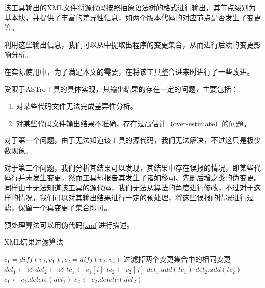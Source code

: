 该工具输出的XML文件将源代码按照抽象语法树的格式进行输出，其节点级别为基本块，并提供了丰富的差异性信息，如两个版本代码的对应节点是否发生了变更等。

利用这些输出信息，我们可以从中提取出程序的变更集合，从而进行后续的变更影响分析。

在实际使用中，为了满足本文的需要，在将该工具整合进来时进行了一些改进。


受限于ASTro工具的具体实现，其输出结果的存在一定的问题，主要包括：
\begin{enumerate}
	\item 对某些代码文件无法完成差异性分析。
	\item 对某些代码文件输出结果不准确，存在过高估计（over-estimate）的问题。
\end{enumerate}

对于第一个问题，由于无法知道该工具的源代码，我们无法解决，不过这只是极少数现象。

对于第二个问题，我们分析其结果可以发现，其结果中存在误报的情况，即某些代码行并未发生变更，然而工具却报告其发生了诸如移动、先删后增之类的伪变更。同样由于无法知道该工具的源代码，我们无法从算法的角度进行修改，不过对于这样的情况，我们可以对其输出结果进行一定的预处理，将这些误报的情况进行过滤，保留一个真变更子集合即可。

预处理算法可以用伪代码\ref {xml}进行描述。

\begin{algorithm}
	\caption{XML结果过滤算法}
	\label{xml}
	\begin{algorithmic}[1]
		\Require $c_1 = diff(v_2, v_1), c_2 = diff(v_2,v_4)$
		\Ensure 过滤掉两个变更集合中的相同变更
		\State $del_1 \gets \varnothing$
		\State $del_2 \gets \varnothing$
		\State $tc_1 \gets c_1[i]$
		\State $tc_2 \gets c_2[j]$
		\State $del_1.add(tc_1)$
		\State $del_2.add(tc_2)$
		\EndIf	
		\EndFor
		\EndFor
		\State $c_1 \gets c_1.delete(del_1)$
		\State $c_2 \gets c_2.delete(del_2)$
	\end{algorithmic}
\end{algorithm}

